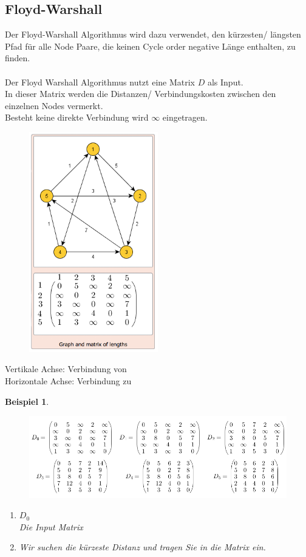 \documentclass[a4paper,10pt]{report}
\newtheorem{myexample}{Beispiel}
\begin{document}
\subsection{Floyd-Warshall}
Der Floyd-Warshall Algorithmus wird dazu verwendet, den kürzesten/ längsten Pfad  für alle Node Paare, die keinen Cycle order negative Länge enthalten, zu finden.\\
\\
Der Floyd Warshall Algorithmus nutzt eine Matrix $D$ als Input.\\
In dieser Matrix werden die Distanzen/ Verbindungskosten zwischen den einzelnen Nodes vermerkt.\\ Besteht keine direkte Verbindung wird $\infty$ eingetragen.
\begin{figure}[H]
	\begin{center}
  		\includegraphics[width=0.5\textwidth]{img/floyd.png}
	\end{center}
\end{figure}
\noindent
Vertikale Achse: Verbindung von\\
Horizontale Achse: Verbindung zu
\newpage
\begin{myexample}
\begin{figure}[H]
	\begin{center}
  		\includegraphics[width=\textwidth]{img/floydexample.png}
	\end{center}
\end{figure}
\begin{enumerate}
	\item
	$D_0$\\
	Die Input Matrix
	\item
	Wir suchen die kürzeste Distanz und tragen Sie in die Matrix ein.
\end{enumerate}
\end{myexample}
\end{document}
